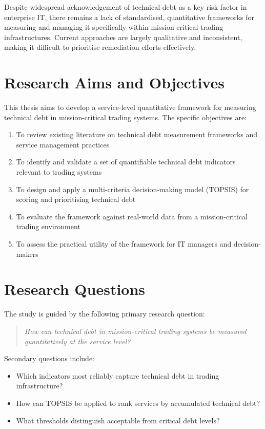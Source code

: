 \documentclass[
  british,
  12pt,
  a4paper,
]{report}
\providecommand{\tightlist}{%
  \setlength{\itemsep}{0pt}\setlength{\parskip}{0pt}}
\begin{document}
Despite widespread acknowledgement of technical debt as a key risk
factor in enterprise IT, there remains a lack of standardised,
quantitative frameworks for measuring and managing it specifically
within mission-critical trading infrastructures. Current approaches are
largely qualitative and inconsistent, making it difficult to prioritise
remediation efforts effectively.

\section{Research Aims and
Objectives}\label{research-aims-and-objectives}

This thesis aims to develop a service-level quantitative framework for
measuring technical debt in mission-critical trading systems. The
specific objectives are:

\begin{enumerate}
\def\labelenumi{\arabic{enumi}.}
\tightlist
\item
  To review existing literature on technical debt measurement frameworks
  and service management practices
\item
  To identify and validate a set of quantifiable technical debt
  indicators relevant to trading systems
\item
  To design and apply a multi-criteria decision-making model (TOPSIS)
  for scoring and prioritising technical debt
\item
  To evaluate the framework against real-world data from a
  mission-critical trading environment
\item
  To assess the practical utility of the framework for IT managers and
  decision-makers
\end{enumerate}

\section{Research Questions}\label{research-questions}

The study is guided by the following primary research question:

\begin{quote}
\emph{How can technical debt in mission-critical trading systems be
measured quantitatively at the service level?}
\end{quote}

Secondary questions include:

\begin{itemize}
\tightlist
\item
  Which indicators most reliably capture technical debt in trading
  infrastructure?
\item
  How can TOPSIS be applied to rank services by accumulated technical
  debt?
\item
  What thresholds distinguish acceptable from critical debt levels?
\end{itemize}
\end{document}
